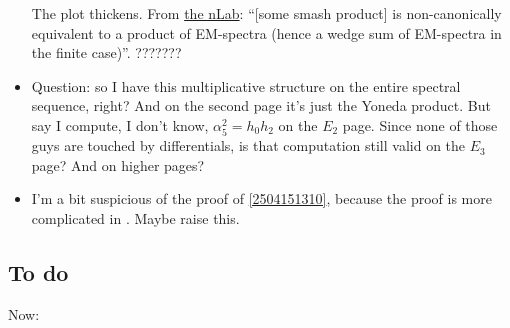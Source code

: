 \documentclass{MetricNotes2023}
\begin{document}
\begin{itemize}
The plot thickens. From \href{https://ncatlab.org/nlab/show/Eilenberg-Mac+Lane+spectrum}{the nLab}: ``[some smash product] is non-canonically equivalent to a product of EM-spectra (hence a wedge sum of EM-spectra in the finite case)''. ???????

\item Question: so I have this multiplicative structure on the entire spectral sequence, right? And on the second page it's just the Yoneda product. But say I compute, I don't know, \(\alpha^2_5=h_0h_2\) on the \(E_2\)  page. Since none of those guys are touched by differentials, is that computation still valid on the \(E_3\) page? And on higher pages?

\item I'm a bit suspicious of the proof of \ref{2504151310}, because the proof is more complicated in \autocite{hatcher5}. Maybe raise this.
\end{itemize}

\subsection{To do}\label{2503221342}

Now:
\end{document}
